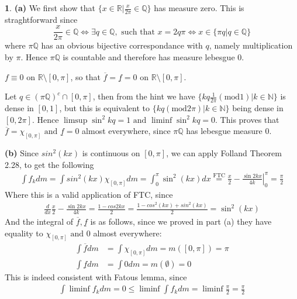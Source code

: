 \documentclass[10.5pt]{article}
\theoremstyle{definition}
\newtheorem{pb}{}
\newcommand{\set}[1]{\{#1\}}
\newcommand{\tand}{\text{ and }}
\begin{document}
\begin{pb}
    \textbf{(a)} We first show that \(\set{x \in \mathbb{R} \vert \frac{x}{2\pi} \in \mathbb{Q}}\) has measure zero. This is straghtforward since 
    \[\frac{x}{2\pi} \in \mathbb{Q} \iff \exists q \in \mathbb{Q}, \text{ such that } x = 2q\pi \iff x \in \set{\pi q \vert q \in \mathbb{Q}}\]
    where \(\pi \mathbb{Q}\) has an obvious bijective correspondance with \(q\), namely multiplication by \(\pi\). Hence \(\pi \mathbb{Q}\) is countable
    and therefore has measure lebesgue \(0\).

    \(f \equiv 0\) on \(\mathbb{R}\setminus[0,\pi]\), so that \(\overline{f} = \underline{f} = 0\) on \(\mathbb{R}\setminus[0,\pi]\).

    Let \(q \in (\pi \mathbb{Q})^c \cap[0,\pi]\), then from the hint we have \(\set{k q\frac{1}{2\pi} (\text{mod}1)\vert k \in \mathbb{N}}\) is dense in \([0,1]\), but this is equivalent to
    \(\set{kq (\text{mod}2\pi)\vert k \in \mathbb{N}}\) being dense in \([0,2\pi]\). Hence \(\limsup \sin^2 kq = 1 \tand \liminf \sin^2 kq = 0\). This proves that 
    \(\overline{f} = \chi_{[0,\pi]} \tand \underline{f} = 0\) almost everywhere, since \(\pi \mathbb{Q}\) has lebesgue measure \(0\).

    \textbf{(b)} 
    Since \(sin^2(kx)\) is continuous on \([0,\pi]\), we can apply Folland Theorem 2.28, to get the following
    \begin{align*}
        \int f_k dm = \int sin^2(kx)\chi_[0,\pi]dm = \int_0^\pi \sin^2(kx)dx \overset{\text{FTC}}{=} \left.\frac{x}{2} - \frac{\sin2kx}{4k}\right\vert_0^\pi = \frac{\pi}{2}
    \end{align*}
    Where this is a valid application of FTC, since
    \begin{align*}
        \frac{d}{dx} \frac{x}{2} - \frac{\sin2kx}{4k} = \frac{1 - cos2kx}{2} = \frac{1 - cos^2(kx) + sin^2(kx)}{2} = \sin^2(kx)
    \end{align*}
    And the integral of \(\overline{f}, \underline{f}\) is as follows, since we proved in part (a)  they have equality to \(\chi_[0,\pi] \tand 0\) almost everywhere:
    \begin{align*}
        \int \overline{f} dm &= \int \chi_{[0,\pi]} dm = m([0,\pi]) = \pi \\
        \int \underline{f} dm &= \int 0 dm = m(\emptyset) = 0
    \end{align*}
    This is indeed consistent with Fatous lemma, since
    \begin{align*}
        \int \liminf f_k dm = 0 \leq \liminf \int f_k dm = \liminf \frac{\pi}{2} = \frac{\pi}{2}
    \end{align*}
\end{pb}
\end{document}
